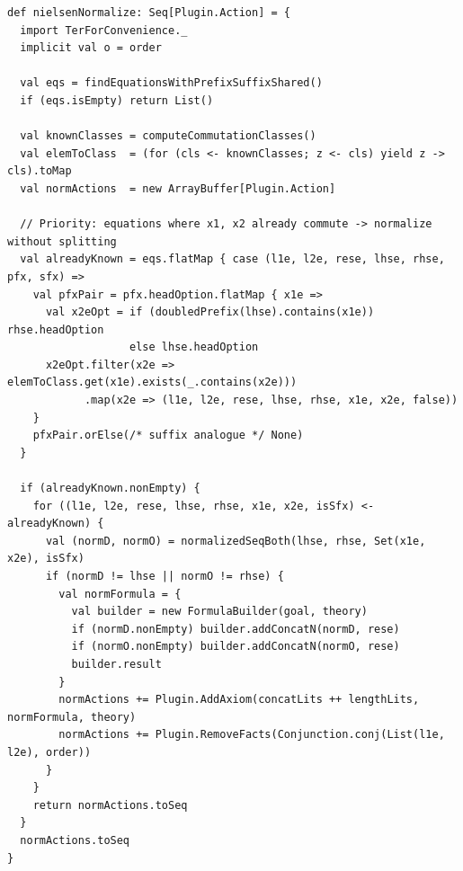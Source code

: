 \documentclass[14pt, russian]{scrartcl}
\begin{document}
\newpage
\begin{listing}[H]
\caption{Нормализация уравнений при известных классах коммутации}
\label{lst:normalize}
\begin{verbatim}
def nielsenNormalize: Seq[Plugin.Action] = {
  import TerForConvenience._
  implicit val o = order

  val eqs = findEquationsWithPrefixSuffixShared()
  if (eqs.isEmpty) return List()

  val knownClasses = computeCommutationClasses()
  val elemToClass  = (for (cls <- knownClasses; z <- cls) yield z -> cls).toMap
  val normActions  = new ArrayBuffer[Plugin.Action]

  // Priority: equations where x1, x2 already commute -> normalize without splitting
  val alreadyKnown = eqs.flatMap { case (l1e, l2e, rese, lhse, rhse, pfx, sfx) =>
    val pfxPair = pfx.headOption.flatMap { x1e =>
      val x2eOpt = if (doubledPrefix(lhse).contains(x1e)) rhse.headOption
                   else lhse.headOption
      x2eOpt.filter(x2e => elemToClass.get(x1e).exists(_.contains(x2e)))
            .map(x2e => (l1e, l2e, rese, lhse, rhse, x1e, x2e, false))
    }
    pfxPair.orElse(/* suffix analogue */ None)
  }

  if (alreadyKnown.nonEmpty) {
    for ((l1e, l2e, rese, lhse, rhse, x1e, x2e, isSfx) <- alreadyKnown) {
      val (normD, normO) = normalizedSeqBoth(lhse, rhse, Set(x1e, x2e), isSfx)
      if (normD != lhse || normO != rhse) {
        val normFormula = {
          val builder = new FormulaBuilder(goal, theory)
          if (normD.nonEmpty) builder.addConcatN(normD, rese)
          if (normO.nonEmpty) builder.addConcatN(normO, rese)
          builder.result
        }
        normActions += Plugin.AddAxiom(concatLits ++ lengthLits, normFormula, theory)
        normActions += Plugin.RemoveFacts(Conjunction.conj(List(l1e, l2e), order))
      }
    }
    return normActions.toSeq
  }
  normActions.toSeq
}
\end{verbatim}
\end{listing}
\end{document}
